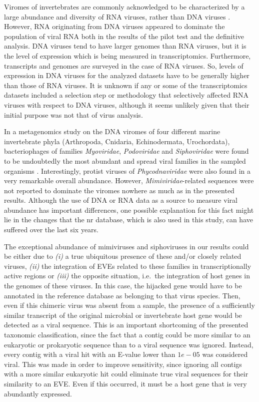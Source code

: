 \documentclass[
  openany]{book}
\begin{document}
Viromes of invertebrates are commonly acknowledged to be characterized by a large abundance and diversity of RNA viruses, rather than DNA viruses \autocite{Harvey2022,Porter2019}. However, RNA originating from DNA viruses appeared to dominate the population of viral RNA both in the results of the pilot test and the definitive analysis. DNA viruses tend to have larger genomes than RNA viruses, but it is the level of expression which is being measured in transcriptomics. Furthermore, transcripts and genomes are surveyed in the case of RNA viruses. So, levels of expression in DNA viruses for the analyzed datasets have to be generally higher than those of RNA viruses. It is unknown if any or some of the transcriptomics datasets included a selection step or methodology that selectively affected RNA viruses with respect to DNA viruses, although it seems unlikely given that their initial purpose was not that of virus analysis.

In a metagenomics study on the DNA viromes of four different marine invertebrate phyla (Arthropoda, Cnidaria, Echinodermata, Urochordata), bacteriophages of families \emph{Myoviridae}, \emph{Podoviridae} and \emph{Siphoviridae} were found to be undoubtedly the most abundant and spread viral families in the sampled organisms \autocite{Gudenkauf2016}. Interestingly, protist viruses of \emph{Phycodnaviridae} were also found in a very remarkable overall abundance. However, \emph{Mimiviridae}-related sequences were not reported to dominate the viromes nowhere as much as in the presented results. Although the use of DNA or RNA data as a source to measure viral abundance has important differences, one possible explanation for this fact might lie in the changes that the nr database, which is also used in this study, can have suffered over the last six years.

The exceptional abundance of mimiviruses and siphoviruses in our results could be either due to \emph{(i)} a true ubiquitous presence of these and/or closely related viruses, \emph{(ii)} the integration of EVEs related to these families in transcriptionally active regions or \emph{(iii)} the opposite situation, i.e.~the integration of host genes in the genomes of these viruses. In this case, the hijacked gene would have to be annotated in the reference database as belonging to that virus species. Then, even if this chimeric virus was absent from a sample, the presence of a sufficiently similar transcript of the original microbial or invertebrate host gene would be detected as a viral sequence. This is an important shortcoming of the presented taxonomic classification, since the fact that a contig could be more similar to an eukaryotic or prokaryotic sequence than to a viral sequence was ignored. Instead, every contig with a viral hit with an E-value lower than \(1e-05\) was considered viral. This was made in order to improve sensitivity, since ignoring all contigs with a more similar eukaryotic hit could eliminate true viral sequences for their similarity to an EVE. Even if this occurred, it must be a host gene that is very abundantly expressed.
\end{document}
